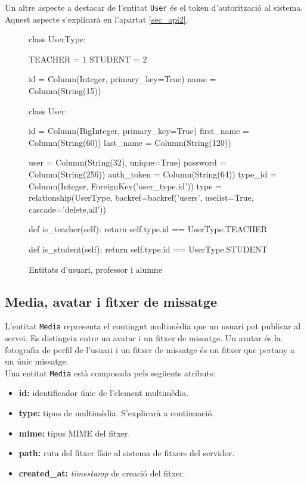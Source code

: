 	Un altre aspecte a destacar de l'entitat \texttt{User} és el token d'autorització al sistema. Aquest aspecte s'explicarà en l'apartat \ref{sec_api2}.
	
\begin{figure}[here]
	\begin{python}
	class UserType:
	
    	TEACHER = 1
    	STUDENT = 2

    	id = Column(Integer, primary_key=True)
    	name = Column(String(15))
    	
	class User:
	
    	id = Column(BigInteger, primary_key=True)
    	first_name = Column(String(60))
    	last_name = Column(String(120))

    	user = Column(String(32), unique=True)
    	password = Column(String(256))
   		auth_token = Column(String(64))
    	type_id = Column(Integer, ForeignKey('user_type.id'))
    	type = relationship(UserType, backref=backref('users', uselist=True, cascade='delete,all'))
    	
    	def is_teacher(self):
    		return self.type.id == UserType.TEACHER
    		
    	def is_student(self):
    		return self.type.id == UserType.STUDENT
	\end{python}
    \caption{Entitats d'usuari, professor i alumne}
    \label{fig:entitats_usuari}
\end{figure}

	\subsection{Media, avatar i fitxer de missatge} \label{media_avatar_fitxer}
	L'entitat \texttt{Media} representa el contingut multimèdia que un usuari pot publicar al servei. Es distingeix entre un avatar i un fitxer de missatge. Un avatar és la fotografia de perfil de l'usuari i un fitxer de missatge és un fitxer que pertany a un únic missatge. \\
	
	Una entitat \texttt{Media} està composada pels següents atributs:
	
	\begin{itemize}
		\item \textbf{id:} identificador únic de l'element multimèdia.
		\item \textbf{type:} tipus de multimèdia. S'explicarà a continuació.
		\item \textbf{mime:} típus \ac{MIME} del fitxer.
		\item \textbf{path:} ruta del fitxer físic al sistema de fitxers del servidor.
		\item \textbf{created\_at:} \emph{timestamp} de creació del fitxer.
	\end{itemize}
	
